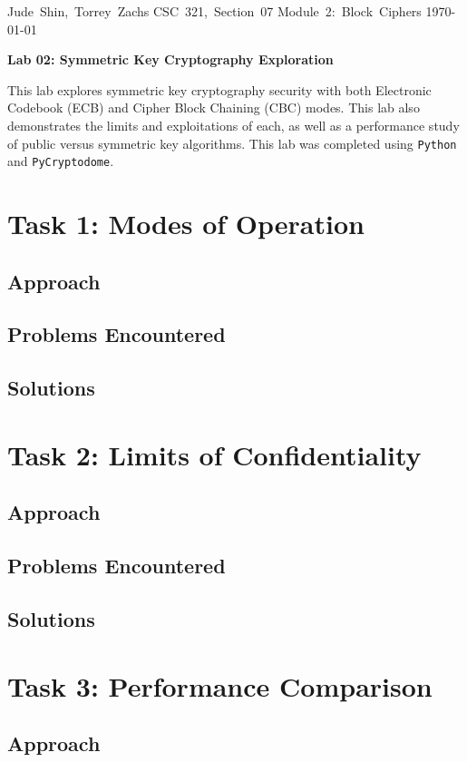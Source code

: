 \documentclass[11pt]{article}
\begin{document}
\hfill\vbox{\hbox{Jude Shin, Torrey Zachs}
		\hbox{CSC 321, Section 07}	
		\hbox{Module 2: Block Ciphers}	
		\hbox{\today}}\par

\bigskip
\centerline{\Large\bf Lab 02: Symmetric Key Cryptography Exploration}\par
\bigskip

This lab explores symmetric key cryptography security with both Electronic Codebook (ECB) and Cipher Block Chaining (CBC) modes. This lab also demonstrates the limits and exploitations of each, as well as a performance study of public versus symmetric key algorithms. This lab was completed using {\tt Python} and {\tt PyCryptodome}.

\section*{Task 1: Modes of Operation}
\subsection*{Approach}
\subsection*{Problems Encountered}
\subsection*{Solutions}

\section*{Task 2: Limits of Confidentiality}
\subsection*{Approach}
\subsection*{Problems Encountered}
\subsection*{Solutions}

\section*{Task 3: Performance Comparison}
\subsection*{Approach}
\end{document}
